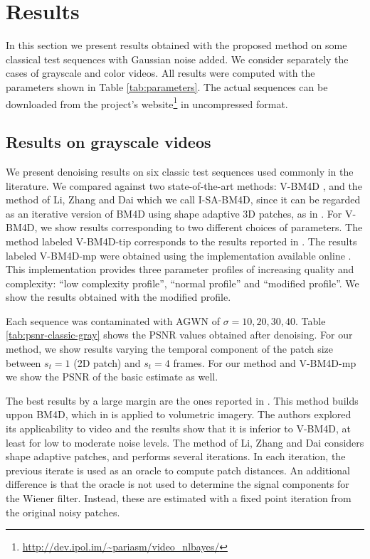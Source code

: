 \documentclass[10pt, journal, twocolumn, final, a4paper]{IEEEtran}
\begin{document}
\section{Results}
\label{sec:results}

In this section we present results obtained with the proposed
method on some classical test sequences with Gaussian noise added.
We consider separately the cases of grayscale and color videos.
All results were computed with the parameters shown in Table \ref{tab:parameters}.
The actual sequences can be downloaded from the project's
website\footnote{\url{http://dev.ipol.im/~pariasm/video_nlbayes/}} in uncompressed format.

\subsection{Results on grayscale videos}

We present denoising results on six classic test sequences used commonly in the
literature. We compared against two state-of-the-art methods: V-BM4D
\cite{Maggioni2012}, and the method of Li, Zhang and Dai \cite{LiZhangDai2011}
which we call I-SA-BM4D, since it can be regarded as an iterative version of BM4D \cite{Maggioni2013}
using shape adaptive 3D patches, as in \cite{Ercole2005}.  
For V-BM4D, we show results corresponding to two
different choices of parameters. The method labeled V-BM4D-tip
corresponds to the results reported
in \cite{Maggioni2012}. The results labeled V-BM4D-mp were
obtained using the implementation available online \cite{bm4dcode}. This
implementation provides three parameter profiles of increasing quality and
complexity: ``low complexity profile'', ``normal profile'' and ``modified
profile''. We show the results obtained with the modified profile.

Each sequence was contaminated with AGWN of $\sigma =
10,20,30,40$. Table \ref{tab:psnr-classic-gray} shows the
PSNR values obtained after denoising. For our method, we show results varying the temporal
component of the patch size between $s_t = 1$ (2D patch) and $s_t = 4$ frames.
For our method and V-BM4D-mp we show the PSNR of the basic estimate as well.

The best results by a large margin are the ones reported in
\cite{LiZhangDai2011}. This method builds uppon BM4D, which in \cite{Maggioni2013}
is applied to volumetric imagery. The authors explored its applicability to video 
and the results show that it is inferior to V-BM4D, at least 
for low to moderate noise levels. The method of Li, Zhang and Dai \cite{LiZhangDai2011} 
considers shape adaptive patches, and performs several iterations. In each iteration,
the previous iterate is used as an oracle to compute patch distances.
{An additional difference is that the oracle is not used to determine the
signal components for the Wiener filter. Instead, these are estimated with a fixed
point iteration from the original noisy patches.}
\end{document}
